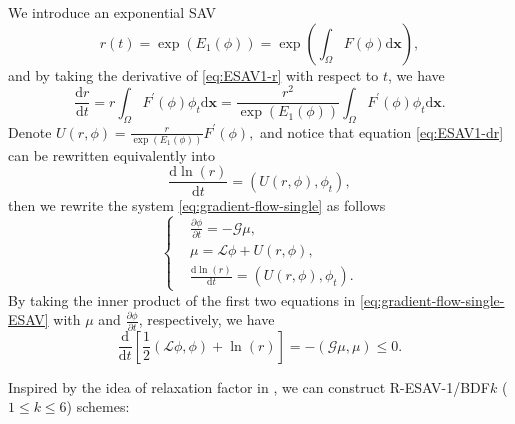 \documentclass[final,review,onefignum,onetabnum]{siamart190516}
\theoremstyle{plain}
\begin{document}
We introduce an exponential SAV
\begin{equation}\label{eq:ESAV1-r}
	r(t) = \exp(E_{1}(\phi))=\exp(\int_{\Omega} F(\phi) \mathrm{d} \boldsymbol{x}),
\end{equation}
and by taking the derivative of \eqref{eq:ESAV1-r} with respect to $t$, we have
\begin{equation}\label{eq:ESAV1-dr}
\frac{\mathrm{d} r}{\mathrm{d} t}=r \int_{\Omega} F^{\prime}(\phi) \phi_{t} \mathrm{d} \boldsymbol{x}=\frac{r^{2}}{\exp \left(E_{1}(\phi)\right)} \int_{\Omega} F^{\prime}(\phi) \phi_{t} \mathrm{d} \boldsymbol{x}.
\end{equation}
Denote 
$
U(r, \phi)=\frac{r}{\exp \left(E_{1}(\phi)\right)} F^{\prime}(\phi),
$
and notice that equation \eqref{eq:ESAV1-dr} can be rewritten equivalently into 
\begin{equation}
\frac{\mathrm{d} \ln (r)}{\mathrm{d} t}=\left(U(r, \phi), \phi_{t}\right),
\end{equation}
then we rewrite the system \eqref{eq:gradient-flow-single} as follows
\begin{equation}
\left\{\begin{aligned}\label{eq:gradient-flow-single-ESAV} 
&\frac{\partial \phi}{\partial t} =-\mathcal{G} \mu, \\ 
&\mu =\mathcal{L} \phi+U(r, \phi), \\ 
&\frac{\mathrm{d} \ln (r)}{\mathrm{d} t}=\left(U(r, \phi), \phi_{t}\right).
\end{aligned}\right.
\end{equation}
By taking the inner product of the first two equations in \eqref{eq:gradient-flow-single-ESAV} with $\mu$ and $\frac{\partial \phi}{\partial t}$, respectively, we have
\begin{equation}
\frac{\mathrm{d}}{\mathrm{d} t}\left[\frac{1}{2}(\mathcal{L} \phi, \phi)+\ln (r)\right]=-(\mathcal{G} \mu, \mu) \leq 0.
\end{equation}

Inspired by the idea of relaxation factor in \cite{jiang2021improving,  zhang2022generalized}, we can construct R-ESAV-1/BDF$k$ ($1 \leq k \leq 6$) schemes:
\end{document}

